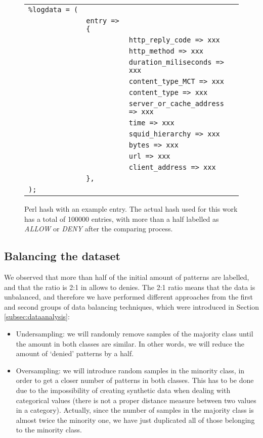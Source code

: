 \documentclass{llncs}
\begin{document}
\begin{figure}[htb]
\centering
\begin{tabular}{ p{0.1cm} p{0.1cm} p{6cm} }
  \texttt{\%logdata~=~(} & & \\
   & \texttt{entry~=>\{} & \\
   & & \texttt{http\_reply\_code => xxx} \\
   & & \texttt{http\_method => xxx} \\
   & & \texttt{duration\_miliseconds => xxx} \\
   & & \texttt{content\_type\_MCT => xxx} \\
   & & \texttt{content\_type => xxx} \\
   & & \texttt{server\_or\_cache\_address => xxx} \\
   & & \texttt{time => xxx} \\
   & & \texttt{squid\_hierarchy => xxx} \\
   & & \texttt{bytes => xxx} \\
   & & \texttt{url => xxx} \\
   & & \texttt{client\_address => xxx} \\
   & \texttt{\},} & \\
  \texttt{);} & & \\
\end{tabular}
\caption{Perl hash with an example entry. The actual hash used for this work has a total of 100000 entries, with more than a half labelled as \textit{ALLOW} or \textit{DENY} after the comparing process. \label{fig:data_hash}}
\end{figure}

%
\subsection{Balancing the dataset}
\label{subsec:balancing}

We observed that more than half of the initial amount of patterns are labelled, and that the ratio is 2:1 in allows to denies. The 2:1 ratio means that the data is unbalanced, and therefore we have performed different approaches from the first and second groups of data balancing techniques, which were introduced in Section \ref{subsec:dataanalysis}:
\begin{itemize}
\item Undersampling: we will randomly remove samples of the majority class until the amount in both classes are similar. In other words, we will reduce the amount of `denied' patterns by a half.
\item Oversampling: we will introduce random samples in the minority class, in order to get a closer number of patterns in both classes. This has to be done due to the impossibility of creating synthetic data when dealing with categorical values (there is not a proper distance measure between two values in a category). Actually, since the number of samples in the majority class is almost twice the minority one, we have just duplicated all of those belonging to the minority class.
\end{itemize}
\end{document}

